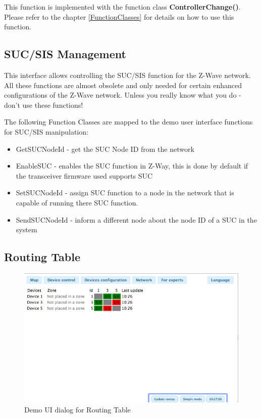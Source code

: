 This function is implemented with the function class {\bf ControllerChange()}. Please 
refer to the chapter \ref{FunctionClasses} for details on how to use this function.

\subsection {SUC/SIS Management}

This interface allows controlling the SUC/SIS function for the Z-Wave network. All 
these functions are almost obsolete and only needed for certain enhanced configurations 
of the Z-Wave network. Unless you really know what you do - don't use these functions!

The following Function Classes are mapped to the demo user interface  functions 
for SUC/SIS manipulation:
\begin{itemize}
\item GetSUCNodeId - get the SUC Node ID from the network
\item EnableSUC - enables the SUC function in Z-Way, this is done by default if the transceiver firmware used supports SUC
\item SetSUCNodeId - assign SUC function to a node in the network that is capable of running there SUC function.
\item SendSUCNodeId - inform a different node about the node ID of a SUC in the system
\end{itemize}


 
\subsection{Routing Table}


\begin{figure} 
\begin{center}
\includegraphics[scale=0.5]{pics/routingtable.png}
\caption{Demo UI dialog for Routing Table}
\label{c2:demorouting} 
\end{center} \end{figure}


